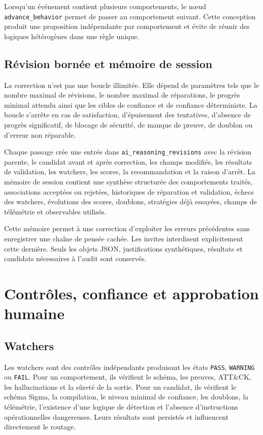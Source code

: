 
Lorsqu'un événement contient plusieurs comportements, le nœud \texttt{advance\_behavior} permet de passer au comportement suivant. Cette conception produit une proposition indépendante par comportement et évite de réunir des logiques hétérogènes dans une règle unique.

\subsection{Révision bornée et mémoire de session}

La correction n'est pas une boucle illimitée. Elle dépend de paramètres tels que le nombre maximal de révisions, le nombre maximal de réparations, le progrès minimal attendu ainsi que les cibles de confiance et de confiance déterministe. La boucle s'arrête en cas de satisfaction, d'épuisement des tentatives, d'absence de progrès significatif, de blocage de sécurité, de manque de preuve, de doublon ou d'erreur non réparable.

Chaque passage crée une entrée dans \texttt{ai\_reasoning\_revisions} avec la révision parente, le candidat avant et après correction, les champs modifiés, les résultats de validation, les watchers, les scores, la recommandation et la raison d'arrêt. La mémoire de session contient une synthèse structurée des comportements traités, associations acceptées ou rejetées, historiques de réparation et validation, échecs des watchers, évolutions des scores, doublons, stratégies déjà essayées, champs de télémétrie et observables utilisés.

Cette mémoire permet à une correction d'exploiter les erreurs précédentes sans enregistrer une chaîne de pensée cachée. Les invites interdisent explicitement cette dernière. Seuls les objets JSON, justifications synthétiques, résultats et candidats nécessaires à l'audit sont conservés.

\section{Contrôles, confiance et approbation humaine}

\subsection{Watchers}

Les watchers sont des contrôles indépendants produisant les états \texttt{PASS}, \texttt{WARNING} ou \texttt{FAIL}. Pour un comportement, ils vérifient le schéma, les preuves, ATT\&CK, les hallucinations et la sûreté de la sortie. Pour un candidat, ils vérifient le schéma Sigma, la compilation, le niveau minimal de confiance, les doublons, la télémétrie, l'existence d'une logique de détection et l'absence d'instructions opérationnelles dangereuses. Leurs résultats sont persistés et influencent directement le routage.

